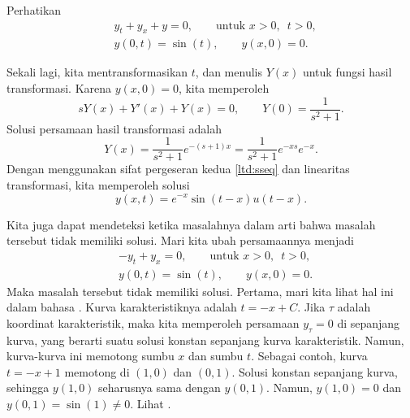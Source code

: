 \begin{example}
Perhatikan
\begin{align*}
& y_t + y_x + y = 0, \qquad \text{untuk } x > 0, \enspace t > 0,
\\
& y(0,t) = \sin(t), \qquad y(x,0) = 0 .
\end{align*}

Sekali lagi, kita mentransformasikan $t$, dan menulis $Y(x)$ untuk
fungsi hasil transformasi.  Karena $y(x,0) = 0$, kita memperoleh
\begin{equation*}
sY(x) + Y'(x) + Y(x) = 0, \qquad 
Y(0) = \frac{1}{s^2+1} .
\end{equation*}
Solusi persamaan hasil transformasi adalah
\begin{equation*}
Y(x) =
\frac{1}{s^2+1} e^{-(s+1) x}
=
\frac{1}{s^2+1} e^{-xs}
e^{-x}
.
\end{equation*}
Dengan menggunakan sifat pergeseran kedua \eqref{ltd:sseq}
dan linearitas transformasi,
kita memperoleh solusi
\begin{equation*}
y(x,t) 
=
e^{-x}
\sin(t-x)
u(t-x) .
\end{equation*}
\end{example}

Kita juga dapat mendeteksi ketika masalahnya
\emph{}
dalam arti bahwa masalah tersebut tidak memiliki solusi.
Mari kita ubah persamaannya menjadi
\begin{align*}
& -y_t + y_x = 0, \qquad \text{untuk } x > 0, \enspace t > 0,
\\
& y(0,t) = \sin(t), \qquad y(x,0) = 0 .
\end{align*}
Maka masalah tersebut
tidak memiliki solusi.  Pertama, mari kita lihat hal ini dalam bahasa
.
Kurva karakteristiknya adalah $t=-x+C$.  Jika $\tau$ adalah
koordinat karakteristik, maka kita memperoleh persamaan $y_\tau = 0$
di sepanjang kurva,
yang berarti suatu solusi konstan sepanjang kurva karakteristik.
Namun, kurva-kurva ini memotong sumbu $x$ dan sumbu $t$.
Sebagai contoh,
kurva $t=-x+1$ memotong di $(1,0)$ dan $(0,1)$.  Solusi
konstan sepanjang kurva, sehingga $y(1,0)$ seharusnya sama dengan $y(0,1)$.  Namun,
$y(1,0) = 0$ dan $y(0,1) = \sin(1) \neq 0$.
Lihat .

\begin{myfig}
\capstart
{}
\caption{Masalah yang tak-terumuskan dengan baik.\label{lt:half-infinite-ill-posed}}
\end{myfig}


